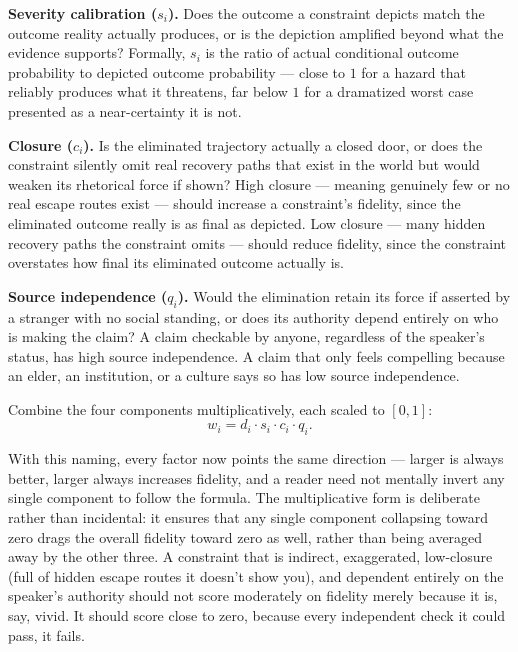 \textbf{Severity calibration ($s_i$).} Does the outcome a constraint depicts match the outcome reality actually produces, or is the depiction amplified beyond what the evidence supports? Formally, $s_i$ is the ratio of actual conditional outcome probability to depicted outcome probability --- close to $1$ for a hazard that reliably produces what it threatens, far below $1$ for a dramatized worst case presented as a near-certainty it is not.

\textbf{Closure ($c_i$).} Is the eliminated trajectory actually a closed door, or does the constraint silently omit real recovery paths that exist in the world but would weaken its rhetorical force if shown? High closure --- meaning genuinely few or no real escape routes exist --- should increase a constraint's fidelity, since the eliminated outcome really is as final as depicted. Low closure --- many hidden recovery paths the constraint omits --- should reduce fidelity, since the constraint overstates how final its eliminated outcome actually is.

\textbf{Source independence ($q_i$).} Would the elimination retain its force if asserted by a stranger with no social standing, or does its authority depend entirely on who is making the claim? A claim checkable by anyone, regardless of the speaker's status, has high source independence. A claim that only feels compelling because an elder, an institution, or a culture says so has low source independence.

\begin{definition}
Combine the four components multiplicatively, each scaled to $[0,1]$:
\[
w_i = d_i \cdot s_i \cdot c_i \cdot q_i.
\]
\end{definition}

With this naming, every factor now points the same direction --- larger is always better, larger always increases fidelity, and a reader need not mentally invert any single component to follow the formula. The multiplicative form is deliberate rather than incidental: it ensures that any single component collapsing toward zero drags the overall fidelity toward zero as well, rather than being averaged away by the other three. A constraint that is indirect, exaggerated, low-closure (full of hidden escape routes it doesn't show you), and dependent entirely on the speaker's authority should not score moderately on fidelity merely because it is, say, vivid. It should score close to zero, because every independent check it could pass, it fails.

